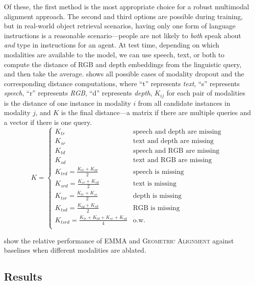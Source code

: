 \documentclass[10pt]{article} %
\newcommand{\ours}{\textsc{EMMA}}
\newcommand{\geom}{\textsc{Geometric Alignment}}
\begin{document}
Of these, the first method is the most appropriate choice for a robust multimodal alignment approach. The second and third options are possible during training, but in real-world object retrieval scenarios, having only one form of language instructions is a reasonable scenario---people are not likely to \textit{both} speak about \textit{and} type in instructions for an agent. At test time, depending on which modalities are available to the model, we can use speech, text, or both to compute the distance of RGB and depth embeddings from the linguistic query, and then take the average.
 shows all possible cases of modality dropout and the corresponding distance computations, where ``t'' represents \textit{text}, ``s'' represents \textit{speech}, ``r'' represents \textit{RGB}, ``d'' represents \textit{depth}, $K_{ij}$ for each pair of modalities is the distance of one instance in modality $i$ from all candidate instances in modality $j$, and $K$ is the final distance---a matrix if there are multiple queries and a vector if there is one query.
\begin{equation}
\label{eq:distance-matrix}
K = 
    \begin{cases} 
        K_{tr} & \text{speech and depth are missing} \\
        K_{sr} & \text{text and depth are missing} \\
        K_{td} & \text{speech and RGB are missing} \\
        K_{sd} & \text{text and RGB are missing} \\
        K_{trd} = \frac{K_{tr} + K_{td} }{2} & \text{speech is missing} \\
        K_{srd} = \frac{K_{sr} + K_{sd} }{2} & \text{text is missing} \\
        K_{tsr} = \frac{K_{tr} + K_{sr} }{2} & \text{depth is missing} \\
        K_{tsd} = \frac{K_{td} + K_{sd} }{2} & \text{RGB is missing} \\
        K_{tsrd} = \frac{K_{tr} + K_{td} + K_{sr} + K_{sd} }{4} & \text{o.w.} \\
    \end{cases}
\end{equation}


 show the relative performance of \ours{} and \geom{} against baselines when different modalities are ablated.


\subsection{Results}
\label{sec:results}
\end{document}
